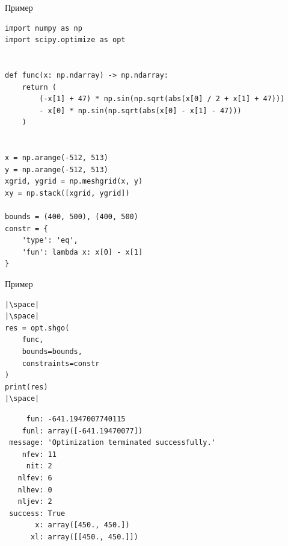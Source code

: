 \documentclass[aspectratio=169, mathserif]{beamer}%
\begin{document}
\begin{frame}[fragile, label=c]{Пример}
\scriptsize
\begin{verbatim}
import numpy as np
import scipy.optimize as opt


def func(x: np.ndarray) -> np.ndarray:
    return (
        (-x[1] + 47) * np.sin(np.sqrt(abs(x[0] / 2 + x[1] + 47)))
        - x[0] * np.sin(np.sqrt(abs(x[0] - x[1] - 47)))
    )


x = np.arange(-512, 513)
y = np.arange(-512, 513)
xgrid, ygrid = np.meshgrid(x, y)
xy = np.stack([xgrid, ygrid])

bounds = (400, 500), (400, 500)
constr = {
    'type': 'eq',
    'fun': lambda x: x[0] - x[1]
}
\end{verbatim}
\vfill
\end{frame}


\begin{frame}[fragile, label=c]{Пример}
\scriptsize
\begin{verbatim}
|\space|
|\space|
res = opt.shgo(
    func,
    bounds=bounds,
    constraints=constr
)
print(res)
|\space|
\end{verbatim}
\vfill
\begin{verbatim}
     fun: -641.1947007740115
    funl: array([-641.19470077])
 message: 'Optimization terminated successfully.'
    nfev: 11
     nit: 2
   nlfev: 6
   nlhev: 0
   nljev: 2
 success: True
       x: array([450., 450.])
      xl: array([[450., 450.]])
\end{verbatim}
\vfill
\end{frame}


\end{document}
